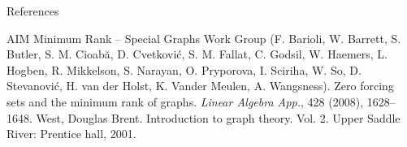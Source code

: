 \documentclass[final]{beamer}
\begin{document}
\begin{frame}{}
\begin{columns}[t]
\begin{column}{0.235 \linewidth}
        
        


        
        

      \begin{block}{References}
      \begin{thebibliography}{20}
      
 AIM Minimum Rank -- Special Graphs Work Group (F. Barioli, W. Barrett, S. Butler, S. M. Cioab\u{a}, D. Cvetkovi\'c, S. M. Fallat, C. Godsil, W. Haemers, L. Hogben,  R. Mikkelson,  S. Narayan,  O. Pryporova,   I. Sciriha,  W. So,   D. Stevanovi\'c,  H. van der Holst, K. Vander Meulen,  A. Wangsness).  Zero forcing sets and the minimum rank  of graphs.   {\em Linear Algebra App.}, 428 (2008),  1628--1648.
 West, Douglas Brent. Introduction to graph theory. Vol. 2. Upper Saddle River: Prentice hall, 2001.
		\end{thebibliography}
        \end{block}

    \end{column}%

  \end{columns}
\end{frame}
\end{document}
